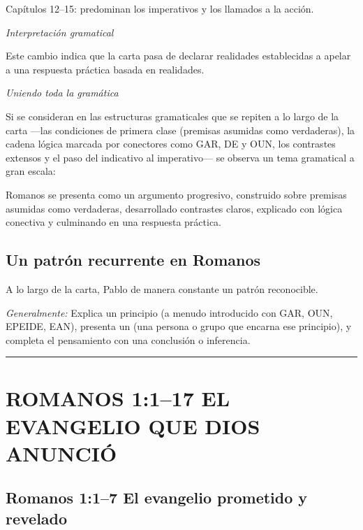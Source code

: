 Capítulos 12--15: predominan los imperativos y los llamados a la acción.

\textit{\textit{Interpretación gramatical}}

Este cambio indica que la carta pasa de declarar realidades establecidas
a apelar a una respuesta práctica basada en  realidades.

\textit{\textit{Uniendo toda la gramática}}

Si se consideran en  las estructuras gramaticales que
se repiten a lo largo de la carta ---las condiciones de primera clase
(premisas asumidas como verdaderas), la cadena lógica marcada por
conectores como GAR, DE y OUN, los contrastes extensos y el paso del
indicativo al imperativo--- se observa un tema gramatical a gran escala:

Romanos se presenta como un argumento progresivo, construido sobre
premisas asumidas como verdaderas, desarrollado 
contrastes claros, explicado con lógica conectiva y culminando en una
respuesta práctica.

\subsection{Un patrón recurrente en
Romanos}\label{un-patruxf3n-recurrente-en-romanos}

A lo largo de la carta, Pablo  de manera constante un
patrón reconocible.

\textit{\textit{Generalmente:}} Explica un principio (a menudo
introducido con GAR, OUN, EPEIDE, EAN), presenta un 
(una persona o grupo que encarna ese principio), y completa el
pensamiento con una conclusión o inferencia.

\begin{center}\rule{0.5\linewidth}{0.5pt}\end{center}

\section{ROMANOS 1:1--17 EL EVANGELIO QUE DIOS
ANUNCIÓ}\label{romanos-1117-el-evangelio-que-dios-anunciuxf3}

\subsection{Romanos 1:1--7 El evangelio prometido y
revelado}\label{romanos-117-el-evangelio-prometido-y-revelado}


